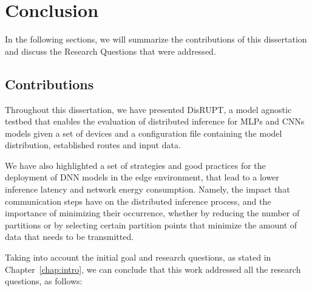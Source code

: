 \chapter{Conclusion} \label{chap:ch6}

In the following sections, we will summarize the contributions of this dissertation
and discuss the Research Questions that were addressed. 

\section{Contributions} \label{sec:se61}

Throughout this dissertation, we have presented \ac{DisRUPT}, a model agnostic testbed 
that enables the evaluation of distributed inference for \acp{MLP} and \acp{CNN} 
models given a set of devices and a configuration file containing the model 
distribution, established routes and input data.

We have also highlighted a set of strategies and good practices for the deployment
of \ac{DNN} models in the edge environment, that lead to a lower inference latency 
and network energy consumption. Namely, the impact that communication steps have on
the distributed inference process, and the importance of minimizing their occurrence,
whether by reducing the number of partitions or by selecting certain partition
points that minimize the amount of data that needs to be transmitted.

Taking into account the initial goal and research questions, as stated in Chapter~\ref{chap:intro},
we can conclude that this work addressed all the research questions, as follows:


